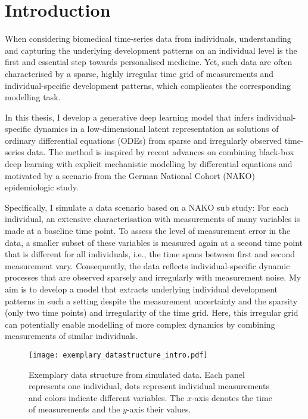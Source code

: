 \chapter{Introduction}\label{chap:intro}
\fancyhead[LO]{\nouppercase{\leftmark}}

When considering biomedical time-series data from individuals, understanding and capturing the underlying development patterns on an individual level is the first and essential step towards personalised medicine. Yet, such data are often characterised by a sparse, highly irregular time grid of measurements and individual-specific development patterns, which complicates the corresponding modelling task. 

In this thesis, I develop a generative deep learning model that infers individual-specific dynamics in a low-dimensional latent representation as solutions of ordinary differential equations (ODEs) from sparse and irregularly observed time-series data. The method is inspired by recent advances on combining black-box deep learning with explicit mechanistic modelling by differential equations and motivated by a scenario from the German National Cohort (NAKO) epidemiologic study.

Specifically, I simulate a data scenario based on a NAKO sub study: For each individual, an extensive characterisation with measurements of many variables is made at a baseline time point. To assess the level of measurement error in the data, a smaller subset of these variables is measured again at a second time point that is different for all individuals, i.e., the time spans between first and second measurement vary. Consequently, the data reflects individual-specific dynamic processes that are observed sparsely and irregularly with measurement noise. My aim is to develop a model that extracts underlying individual development patterns in such a setting despite the measurement uncertainty and the sparsity (only two time points) and irregularity of the time grid. Here, this irregular grid can potentially enable modelling of more complex dynamics by combining measurements of similar individuals.

\begin{figure}
	\texttt{[image: exemplary\_datastructure\_intro.pdf]}
	\caption{Exemplary data structure from simulated data. Each panel represents one individual, dots represent individual measurements and colors indicate different variables. The $x$-axis denotes the time of measurements and the $y$-axis their values.}
	\label{fig:exemplary-data}
\end{figure}

